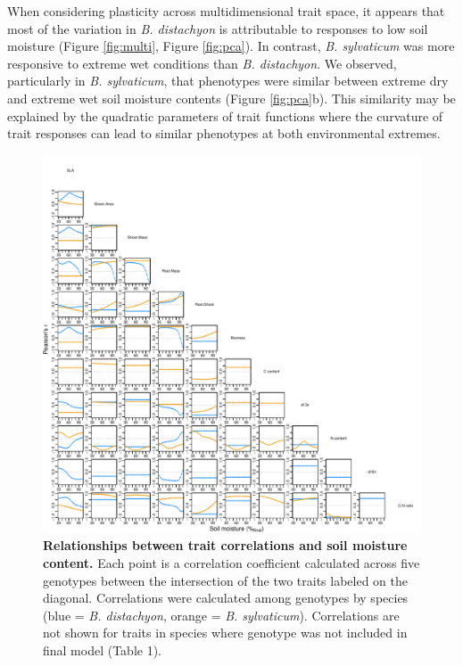\documentclass[jou,floatsintext]{apa6}
\begin{document}
When considering plasticity across multidimensional trait space, it appears that most of the variation in \emph{B. distachyon} is attributable to responses to low soil moisture (Figure \ref{fig:multi}, Figure \ref{fig:pca}). In contrast, \emph{B. sylvaticum} was more responsive to extreme wet conditions than \emph{B. distachyon}. We observed, particularly in \emph{B. sylvaticum}, that phenotypes were similar between extreme dry and extreme wet soil moisture contents (Figure \ref{fig:pca}b). This similarity may be explained by the quadratic parameters of trait functions where the curvature of trait responses can lead to similar phenotypes at both environmental extremes.



\begin{figure}[!h]
\includegraphics[width=\textwidth]{../Figures/corsplots_byspecies} \caption{\textbf{Relationships between trait correlations and soil moisture content.} Each point is a correlation coefficient calculated across five genotypes between the intersection of the two traits labeled on the diagonal. Correlations were calculated among genotypes by species (blue = \emph{B. distachyon}, orange = \emph{B. sylvaticum}). Correlations are not shown for traits in species where genotype was not included in final model (Table 1).}\label{fig:cors}
\end{figure}
\end{document}
